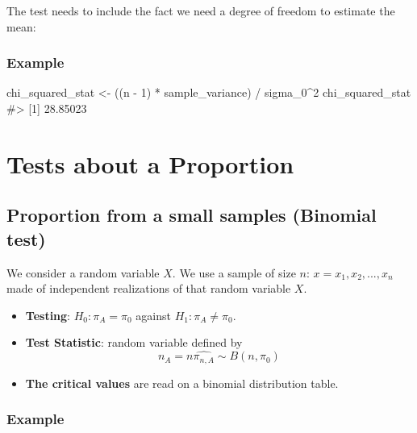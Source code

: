 \documentclass[
  letterpaper,
  DIV=11,
  numbers=noendperiod]{scrreprt}
\newenvironment{Shaded}{\begin{snugshade}}{\end{snugshade}}
\newcommand{\CommentTok}[1]{\textcolor[rgb]{0.37,0.37,0.37}{#1}}
\newcommand{\DecValTok}[1]{\textcolor[rgb]{0.68,0.00,0.00}{#1}}
\newcommand{\NormalTok}[1]{\textcolor[rgb]{0.00,0.23,0.31}{#1}}
\newcommand{\OtherTok}[1]{\textcolor[rgb]{0.00,0.23,0.31}{#1}}
\newcommand{\SpecialCharTok}[1]{\textcolor[rgb]{0.37,0.37,0.37}{#1}}
\providecommand{\tightlist}{%
  \setlength{\itemsep}{0pt}\setlength{\parskip}{0pt}}\usepackage{longtable,booktabs,array}
\begin{document}
The test needs to include the fact we need a degree of freedom to
estimate the mean:

\subsubsection{Example}\label{example-4}

\begin{Shaded}
\begin{Highlighting}[]
\NormalTok{chi\_squared\_stat }\OtherTok{\textless{}{-}}\NormalTok{ ((n }\SpecialCharTok{{-}} \DecValTok{1}\NormalTok{) }\SpecialCharTok{*}\NormalTok{ sample\_variance) }\SpecialCharTok{/}\NormalTok{ sigma\_0}\SpecialCharTok{\^{}}\DecValTok{2}
\NormalTok{chi\_squared\_stat}
\CommentTok{\#\textgreater{} [1] 28.85023}
\end{Highlighting}
\end{Shaded}

\section{Tests about a Proportion}\label{tests-about-a-proportion}

\subsection{Proportion from a small samples (Binomial
test)}\label{proportion-from-a-small-samples-binomial-test}

We consider a random variable \(X\). We use a sample of size \(n\):
\(x = {x_1, x_2,..., x_n}\) made of independent realizations of that
random variable \(X\).

\begin{itemize}
\tightlist
\item
  \textbf{Testing}: \(H_0: \pi_A = \pi_0\) against
  \(H_1: \pi_A \neq \pi_0\).
\item
  \textbf{Test Statistic}: random variable defined by
  \[n_A = n \hat{\pi_{n,A}} \sim B(n, \pi_0)\]
\item
  \textbf{The critical values} are read on a binomial distribution
  table.
\end{itemize}

\subsubsection{Example}\label{example-5}
\end{document}

